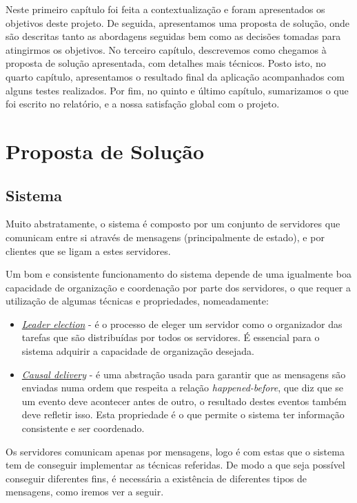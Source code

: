 \documentclass[12pt, a4paper]{report}
\begin{document}
Neste primeiro capítulo foi feita a contextualização e foram apresentados os objetivos deste projeto.
De seguida, apresentamos uma proposta de solução, onde são descritas tanto as abordagens seguidas bem como as decisões tomadas para atingirmos os objetivos.
No terceiro capítulo, descrevemos como chegamos à proposta de solução apresentada, com detalhes mais técnicos.
Posto isto, no quarto capítulo, apresentamos o resultado final da aplicação acompanhados com alguns testes realizados.
Por fim, no quinto e último capítulo, sumarizamos o que foi escrito no relatório, e a nossa satisfação global com o projeto.


\chapter{Proposta de Solução}
\section{Sistema}
Muito abstratamente, o sistema é composto por um conjunto de servidores que comunicam entre si através de mensagens (principalmente de estado), e por clientes que se ligam a estes servidores.

Um bom e consistente funcionamento do sistema depende de uma igualmente boa capacidade de organização e coordenação por parte dos servidores, o que requer a utilização de algumas técnicas e propriedades, nomeadamente:

\begin{itemize}
    \item \underline{\textit{Leader election}} - é o processo de eleger um servidor como o organizador das tarefas que são distribuídas por todos os servidores. É essencial para o sistema adquirir a capacidade de organização desejada.
    \item \underline{\textit{Causal delivery}} - é uma abstração usada para garantir que as mensagens são enviadas numa ordem que respeita a relação \textit{happened-before}, que diz que se um evento deve acontecer antes de outro, o resultado destes eventos também deve refletir isso. Esta propriedade é o que permite o sistema ter informação consistente e ser coordenado.
\end{itemize}

Os servidores comunicam apenas por mensagens, logo é com estas que o sistema tem de conseguir implementar as técnicas referidas. De modo a que seja possível conseguir diferentes fins, é necessária a existência de diferentes tipos de mensagens, como iremos ver a seguir.
\end{document}
